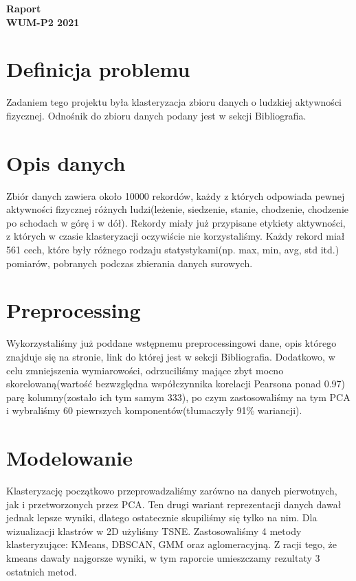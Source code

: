 \documentclass[14pt]{article}
\begin{document}
\noindent
{} \hfill \hfill \llap{\today}

\begin{center}
\Large {\bf Raport} \\
\large \bf WUM-P2 2021
\end{center}

\section*{Definicja problemu}
Zadaniem tego projektu była klasteryzacja zbioru danych o ludzkiej aktywności fizycznej. Odnośnik do zbioru danych podany jest w sekcji Bibliografia.

\section*{Opis danych}
Zbiór danych zawiera około 10000 rekordów, każdy z których odpowiada pewnej aktywności fizycznej różnych ludzi(leżenie, siedzenie, stanie, chodzenie, chodzenie po schodach w górę i w dół). Rekordy miały już przypisane etykiety aktywności, z których w czasie klasteryzacji oczywiście nie korzystaliśmy. Każdy rekord miał 561 cech, które były różnego rodzaju statystykami(np. max, min, avg, std itd.) pomiarów, pobranych podczas zbierania danych surowych.

\section*{Preprocessing}
Wykorzystaliśmy już poddane wstępnemu preprocessingowi dane, opis którego znajduje się na stronie, link do której jest w sekcji Bibliografia. Dodatkowo, w celu zmniejszenia wymiarowości, odrzuciliśmy mające zbyt mocno skorelowaną(wartość bezwzględna współczynnika korelacji Pearsona ponad 0.97) parę kolumny(zostało ich tym samym 333), po czym zastosowaliśmy na tym PCA i wybraliśmy 60 piewrszych komponentów(tłumaczyły 91\% wariancji).

\section*{Modelowanie}
Klasteryzację początkowo przeprowadzaliśmy zarówno na danych pierwotnych, jak i przetworzonych przez PCA. Ten drugi wariant reprezentacji danych dawał jednak lepsze wyniki, dlatego ostatecznie skupiliśmy się tylko na nim. Dla wizualizacji klastrów w 2D użyliśmy TSNE. Zastosowaliśmy 4 metody klasteryzujące: KMeans, DBSCAN, GMM oraz aglomeracyjną. Z racji tego, że kmeans dawały najgorsze wyniki, w tym raporcie umieszczamy rezultaty 3 ostatnich metod.
\end{document}
